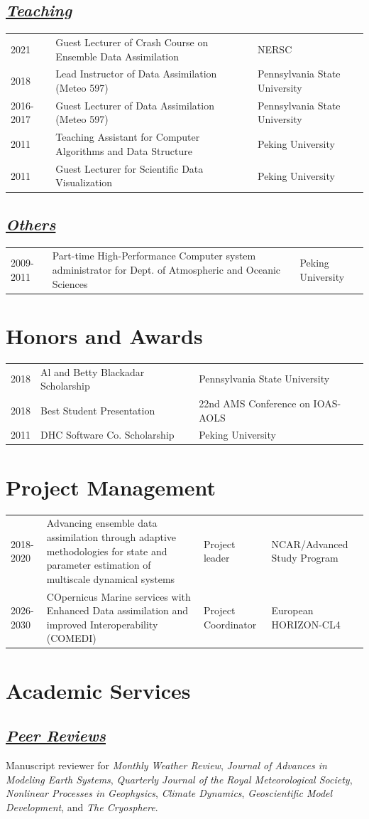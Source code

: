 \documentclass{article}
\newcommand{\cvsection}[1]{\section*{\bfseries#1}}
\newcommand{\cvsubsection}[1]{\subsection*{\itshape\uline{#1}}}
\begin{document}
\cvsubsection{Teaching}
\begin{tabular}{l p{9cm} l}
    2021 & Guest Lecturer of Crash Course on Ensemble Data Assimilation & NERSC \\
    2018 & Lead Instructor of Data Assimilation (Meteo 597) & Pennsylvania State University \\
    2016-2017 & Guest Lecturer of Data Assimilation (Meteo 597) & Pennsylvania State University \\
    2011 & Teaching Assistant for Computer Algorithms and Data Structure & Peking University \\
    2011 & Guest Lecturer for Scientific Data Visualization & Peking University \\
\end{tabular}

\cvsubsection{Others}
\begin{tabular}{l p{9cm} l}
    2009-2011 & Part-time High-Performance Computer system administrator for Dept. of Atmospheric and Oceanic Sciences & Peking University \\
\end{tabular}

\cvsection{Honors and Awards}
\begin{tabular}{l l l}
    2018 & Al and Betty Blackadar Scholarship & Pennsylvania State University \\
    2018 & Best Student Presentation & 22nd AMS Conference on IOAS-AOLS \\
    2011 & DHC Software Co. Scholarship & Peking University \\
\end{tabular}


\cvsection{Project Management}
\begin{tabular}{l p{8cm} p{2cm} p{3cm}}
    2018-2020 & Advancing ensemble data assimilation through adaptive methodologies for state and parameter estimation of multiscale dynamical systems & Project leader & NCAR/Advanced Study Program \\
    2026-2030 & COpernicus Marine services with Enhanced Data assimilation and improved Interoperability (COMEDI) & Project Coordinator & European HORIZON-CL4\\
\end{tabular}


\cvsection{Academic Services}
\cvsubsection{Peer Reviews}
Manuscript reviewer for
\textit{Monthly Weather Review},
\textit{Journal of Advances in Modeling Earth Systems},
\textit{Quarterly Journal of the Royal Meteorological Society},
\textit{Nonlinear Processes in Geophysics},
\textit{Climate Dynamics},
\textit{Geoscientific Model Development},
and
\textit{The Cryosphere}.
\end{document}
